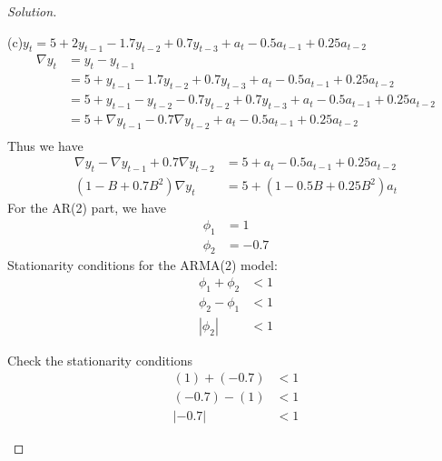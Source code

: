 \documentclass[UTF8,a4paper,14pt]{ctexart}
\newenvironment{solution}
  {\renewcommand\qedsymbol{$\blacksquare$}\begin{proof}[Solution]}
  {\end{proof}}
\theoremstyle{definition}
\theoremstyle{remark}
\begin{document}
\begin{solution}
  \begin{mybox}{(c)\(y_t = 5+2y_{t-1}-1.7y_{t-2}+0.7y_{t-3}+a_t-0.5 a_{t-1}+0.25 a_{t-2}\)}
    \begin{equation*}
      \begin{aligned}
        \nabla y_t 
        &= y_t-y_{t-1}\\
        &=5+y_{t-1}-1.7y_{t-2}+0.7y_{t-3}+a_t-0.5 a_{t-1}+0.25 a_{t-2}\\
        &=5+y_{t-1}-y_{t-2}-0.7y_{t-2}+0.7y_{t-3}+a_t-0.5 a_{t-1}+0.25 a_{t-2}\\
        &=5+\nabla y_{t-1}-0.7\nabla y_{t-2}+a_t-0.5 a_{t-1}+0.25 a_{t-2}\\
      \end{aligned}
    \end{equation*}
    Thus we have
    \begin{equation*}
      \begin{aligned}
        \nabla y_t -\nabla y_{t-1}+0.7\nabla y_{t-2}
        &=5+a_t-0.5a_{t-1}+0.25 a_{t-2}\\
        (1-B+0.7B^2)\nabla y_t &= 5+(1-0.5B+0.25B^2)a_t
      \end{aligned}
    \end{equation*}
    For the AR(2) part, we have
    \begin{equation*}
      \begin{aligned}
      \phi_1 &= 1\\
      \phi_2 &= -0.7
      \end{aligned}
    \end{equation*}
    Stationarity conditions for the ARMA(2)
    model:    \begin{equation}
      \begin{aligned}\label{eq:4.3.11}
      \phi_1 + \phi_2 &<1\\
      \phi_2 - \phi_1 &<1\\
      \left\lvert \phi_2\right\rvert  &< 1
      \end{aligned}
    \end{equation}
    
    Check the stationarity conditions
    \begin{equation*}
      \begin{aligned}
      (1) + (-0.7) &<1\\
      (-0.7) - (1) &<1\\
      \left\lvert -0.7\right\rvert  &< 1
      \end{aligned}
    \end{equation*}



\end{mybox}
\end{solution}
\end{document}
